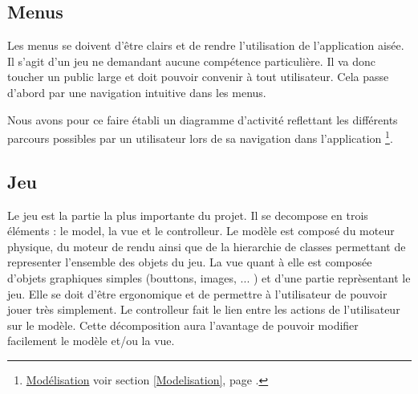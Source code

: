 \subsection{Menus}
		
	Les menus se doivent d'être clairs et de rendre l'utilisation de
	l'application aisée. Il s'agit d'un jeu ne demandant aucune compétence
	particulière. Il va donc toucher un public large et doit pouvoir convenir à
	tout utilisateur. Cela passe d'abord par une navigation intuitive dans les
	menus.
	
	Nous avons pour ce faire établi un diagramme d'activité reflettant les
	différents parcours possibles par un utilisateur lors de sa navigation dans
	l'application
	\footnote{
		\hyperlink{Modélisation}{Modélisation}
		\og voir section \ref{Modelisation}, page \pageref{Modelisation}.\fg
	}.
		
\subsection{Jeu}
		
	Le jeu est la partie la plus importante du projet. 
	Il se decompose en trois éléments : le model, la vue et le controlleur. 
	Le modèle est composé du moteur physique, du moteur de rendu ainsi que de la
	hierarchie de classes permettant de representer l'ensemble des objets du jeu. 
	La vue quant à elle est composée d'objets graphiques simples (bouttons, images, ... ) 
	et d'une partie reprèsentant le jeu. Elle se doit d'être ergonomique et de permettre
	à l'utilisateur de pouvoir jouer très simplement. Le controlleur fait
	le lien entre les actions de l'utilisateur sur le modèle. Cette décomposition aura
	l'avantage de pouvoir modifier facilement le modèle et/ou la vue.
		
